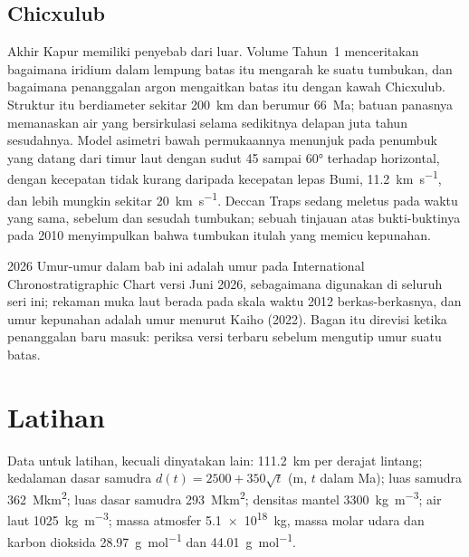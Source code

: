 \subsection*{Chicxulub}

Akhir Kapur memiliki penyebab dari luar. Volume Tahun~1 menceritakan bagaimana iridium dalam
lempung batas itu mengarah ke suatu tumbukan, dan bagaimana penanggalan argon mengaitkan batas itu dengan kawah Chicxulub.
Struktur itu berdiameter sekitar \qty{200}{km} dan berumur \qty{66}{Ma}; batuan
panasnya memanaskan air yang bersirkulasi selama sedikitnya delapan juta tahun sesudahnya. Model asimetri bawah permukaannya
menunjuk pada penumbuk yang datang dari timur laut dengan sudut 45 sampai \ang{60} terhadap horizontal,
dengan kecepatan tidak kurang daripada kecepatan lepas Bumi, \qty{11.2}{km.s^{-1}}, dan lebih mungkin sekitar
\qty{20}{km.s^{-1}}. Deccan Traps sedang meletus pada waktu yang sama, sebelum dan sesudah
tumbukan; sebuah tinjauan atas bukti-buktinya pada 2010 menyimpulkan bahwa tumbukan itulah yang memicu kepunahan.

\begin{dated}{2026}
Umur-umur dalam bab ini adalah umur pada International Chronostratigraphic Chart versi Juni
2026, sebagaimana digunakan di seluruh seri ini; rekaman muka laut berada pada skala waktu 2012
berkas-berkasnya, dan umur kepunahan adalah umur menurut Kaiho (2022). Bagan itu direvisi ketika penanggalan baru
masuk: periksa versi terbaru sebelum mengutip umur suatu batas.
\end{dated}

\section*{Latihan}\label{sec:b2:phanerozoic-earth:exercises}

Data untuk latihan, kecuali dinyatakan lain: \qty{111.2}{km} per derajat lintang; kedalaman
dasar samudra $d(t) = 2500 + 350\sqrt t$ (\unit{m}, $t$ dalam \unit{Ma}); luas samudra
\qty{362}{\mega km^2}; luas dasar samudra \qty{293}{\mega km^2}; densitas mantel
\qty{3300}{kg.m^{-3}}; air laut \qty{1025}{kg.m^{-3}}; massa atmosfer
\qty{5.1e18}{kg}, massa molar udara dan karbon dioksida \qty{28.97}{g.mol^{-1}} dan
\qty{44.01}{g.mol^{-1}}.


